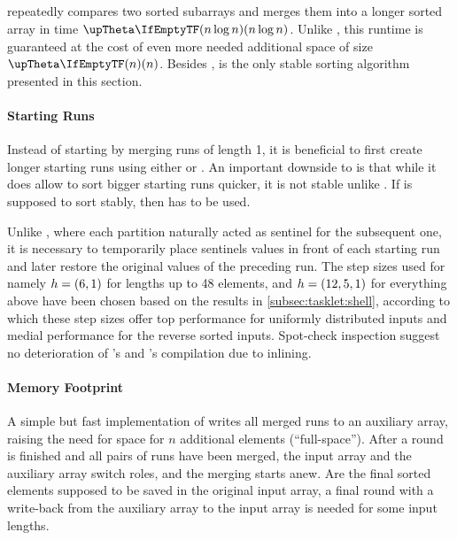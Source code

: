 \subsection{\texorpdfstring{\MS{}}{MergeSort}}
\label{subsec:tasklet:merge}

\MS{} repeatedly compares two sorted subarrays and merges them into a longer sorted array in time \(\bigtheta{n \log n}\).
Unlike \QS{}, this runtime is guaranteed at the cost of even more needed additional space of size \(\bigtheta{n}\).
Besides \IS{}, \MS{} is the only stable sorting algorithm presented in this section.

\paragraph{Starting Runs}
Instead of starting by merging runs of length 1, it is beneficial to first create longer starting runs using either \IS{} or \ShS{}.
An important downside to \ShS{} is that while it does allow to sort bigger starting runs quicker, it is not stable unlike \IS{}.
If \MS{} is supposed to sort stably, then \IS{} has to be used.

Unlike \QS{}, where each partition naturally acted as sentinel for the subsequent one, it is necessary to temporarily place sentinels values in front of each starting run and later restore the original values of the preceding run.
The step sizes used for \ShS{} \Dash namely \(h = (6, 1)\) for lengths up to 48 elements, and \(h = (12, 5, 1)\) for everything above \Dash have been chosen based on the results in \cref{subsec:tasklet:shell}, according to which these step sizes offer top performance for uniformly distributed inputs and medial performance for the reverse sorted inputs.
Spot-check inspection suggest no deterioration of \IS{}'s and \ShS{}'s compilation due to inlining.

\paragraph{Memory Footprint}
A simple but fast implementation of \MS{} writes all merged runs to an auxiliary array, raising the need for space for \(n\) additional elements (\enquote{full-space}).
After a round is finished and all pairs of runs have been merged, the input array and the auxiliary array switch roles, and the merging starts anew.
Are the final sorted elements supposed to be saved in the original input array, a final round with a write-back from the auxiliary array to the input array is needed for some input lengths.

